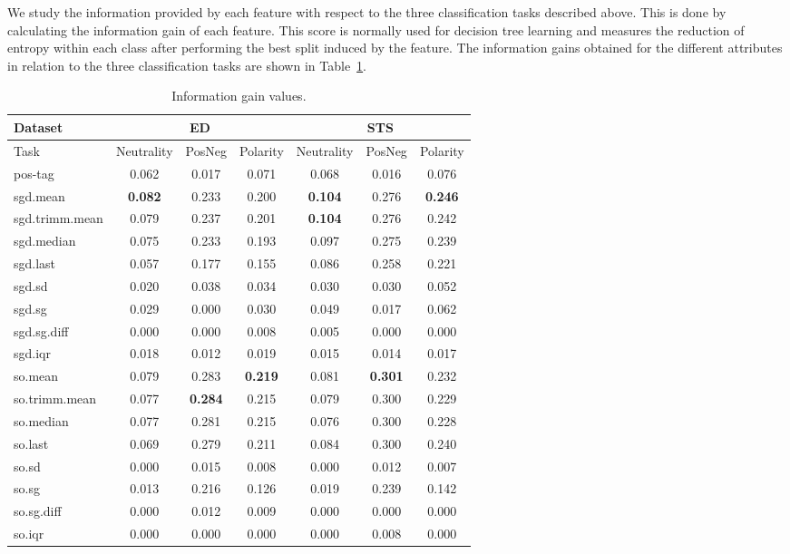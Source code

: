 \documentclass{sig-alternate}
\begin{document}
We study the information provided by each feature with respect to the three classification tasks described above. This is done by calculating the information gain of each feature. This score is normally used for decision tree learning and  measures the reduction of entropy within each class after performing the best split induced by the feature. The information gains obtained for the different attributes in relation to the three classification tasks are shown in Table~\ref{tab:infogains}.
 
\begin{table}[htb]
\footnotesize
\centering
\begin{tabular}{l|ccc|ccc}
\hline
Dataset & \multicolumn{3}{c|}{ED} & \multicolumn{3}{c}{STS} \\ \hline
 Task &  Neutrality & PosNeg & Polarity &  Neutrality & PosNeg & Polarity  \\ \hline
pos-tag &  0.062 & 0.017  & 0.071 & 0.068 & 0.016 & 0.076  \\ 
sgd.mean & \textbf{0.082}  & 0.233  &  0.200 & \textbf{0.104} & 0.276 & \textbf{0.246}  \\ 
sgd.trimm.mean & 0.079 & 0.237 & 0.201 & \textbf{0.104} & 0.276 & 0.242 \\ 
sgd.median & 0.075 & 0.233 & 0.193  & 0.097 & 0.275 & 0.239 \\ 
sgd.last & 0.057 & 0.177 & 0.155  & 0.086 & 0.258 & 0.221  \\ 
sgd.sd & 0.020 & 0.038 & 0.034  & 0.030 & 0.030 & 0.052 \\
sgd.sg & 0.029 & 0.000 & 0.030 & 0.049 & 0.017 & 0.062 \\
sgd.sg.diff &  0.000 & 0.000 & 0.008 & 0.005 & 0.000 & 0.000 \\ 
sgd.iqr &  0.018 & 0.012 & 0.019 & 0.015 & 0.014 & 0.017 \\ 
so.mean & 0.079 & 0.283 & \textbf{0.219}  & 0.081 & \textbf{0.301} & 0.232 \\ 
so.trimm.mean & 0.077 & \textbf{0.284} & 0.215 & 0.079 & 0.300 & 0.229 \\ 
so.median & 0.077 & 0.281 & 0.215 & 0.076 & 0.300 & 0.228 \\
so.last & 0.069 & 0.279  &  0.211 & 0.084 & 0.300 & 0.240  \\  
so.sd  & 0.000 & 0.015 & 0.008 & 0.000 & 0.012 & 0.007 \\
so.sg &  0.013 & 0.216 & 0.126 & 0.019 & 0.239 & 0.142 \\ 
so.sg.diff & 0.000 & 0.012 & 0.009 & 0.000 & 0.000 & 0.000 \\
so.iqr & 0.000 & 0.000 & 0.000  & 0.000 & 0.008 & 0.000 \\      \hline
\end{tabular}
\caption{Information gain values.}
\label{tab:infogains}
\end{table}
 
\end{document}

